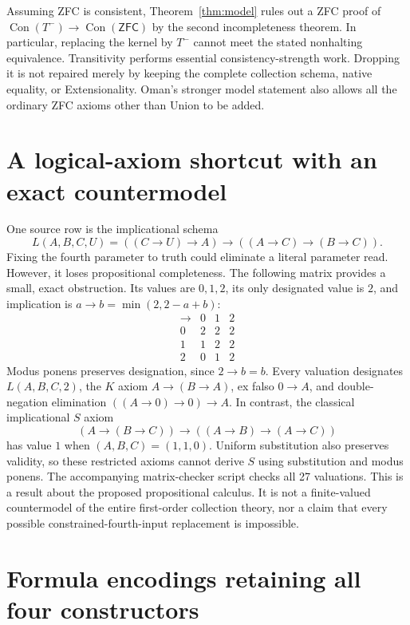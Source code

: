 \documentclass[11pt]{article}
\newcommand{\ZFC}{\mathsf{ZFC}}
\newcommand{\Con}{\operatorname{Con}}
\begin{document}
Assuming ZFC is consistent, Theorem~\ref{thm:model} rules out a ZFC proof of
$\Con(T^-)\longrightarrow\Con(\ZFC)$ by the second incompleteness theorem.
In particular, replacing the kernel by $T^-$ cannot meet the stated
nonhalting equivalence.  Transitivity performs essential consistency-strength
work.  Dropping it is not repaired merely by keeping the complete collection
schema, native equality, or Extensionality.  Oman's stronger model statement
also allows all the ordinary ZFC axioms other than Union to be added.

\section{A logical-axiom shortcut with an exact countermodel}

One source row is the implicational schema
\[
 L(A,B,C,U)=((C\to U)\to A)\to((A\to C)\to(B\to C)).
\]
Fixing the fourth parameter to truth could eliminate a literal parameter
read.  However, it loses propositional completeness.  The following matrix
provides a small, exact obstruction.  Its values are $0,1,2$, its only
designated value is $2$, and implication is $a\to b=\min(2,2-a+b)$:
\[
\begin{array}{c|ccc}
\to&0&1&2\\\hline
0&2&2&2\\
1&1&2&2\\
2&0&1&2
\end{array}
\]
Modus ponens preserves designation, since $2\to b=b$.
Every valuation designates $L(A,B,C,2)$, the $K$ axiom
$A\to(B\to A)$, ex falso $0\to A$, and double-negation elimination
$((A\to0)\to0)\to A$.  In contrast, the classical implicational $S$ axiom
\[
 (A\to(B\to C))\to((A\to B)\to(A\to C))
\]
has value $1$ when $(A,B,C)=(1,1,0)$.  Uniform substitution also preserves
validity, so these restricted axioms cannot derive $S$ using substitution
and modus ponens.  The accompanying matrix-checker script checks
all 27 valuations.  This is a result about the proposed propositional
calculus.  It is not a finite-valued countermodel of the entire first-order
collection theory, nor a claim that every possible constrained-fourth-input
replacement is impossible.

\section{Formula encodings retaining all four constructors}
\end{document}
